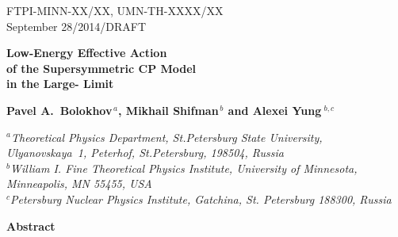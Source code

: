 \documentclass[epsfig,12pt]{article}
\begin{document}
\begin{titlepage}


\begin{flushright}
FTPI-MINN-XX/XX, UMN-TH-XXXX/XX\\
September 28/2014/DRAFT
\end{flushright}

\vspace{1.0cm}

\begin{center}
{  \Large \bf  Low-Energy Effective Action\\[1mm]
    of the Supersymmetric CP Model\\[3mm]
    in the Large- Limit}
\end{center}



\vspace{2mm}

\begin{center}

 {\large
 \bf   Pavel A.~Bolokhov$^{\,a}$,  Mikhail Shifman$^{\,b}$ and \bf Alexei Yung$^{\,\,b,c}$}
\end {center}

\begin{center}

$^a${\it Theoretical Physics Department, St.Petersburg State University, Ulyanovskaya~1, 
	 Peterhof, St.Petersburg, 198504, Russia}\\
$^b${\it  William I. Fine Theoretical Physics Institute,
University of Minnesota,
Minneapolis, MN 55455, USA}\\
$^{c}${\it Petersburg Nuclear Physics Institute, Gatchina, St. Petersburg
188300, Russia
}
\end{center}

\vspace{0.6cm}

\begin{center}
{\large\bf Abstract}
\end{center}


\end{titlepage}
\end{document}
